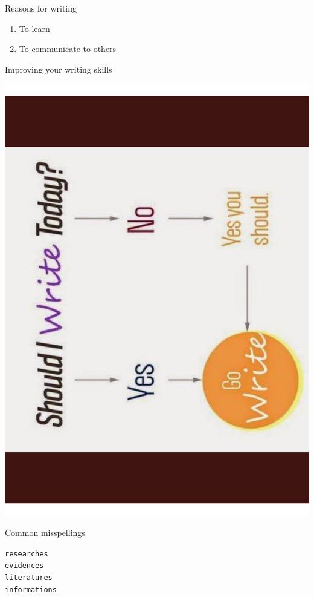 \documentclass{beamer}
\begin{document}
% 
\begin{frame}{Reasons for writing}
	\begin{enumerate}
	\item To \alert{learn}
	\item To \alert{communicate} to others
	\end{enumerate}
\end{frame}

% 
\begin{frame}{Improving your writing skills}
	\begin{center}
	\includegraphics[angle = 270, width = .85\textwidth]{images/should_I_write_today.pdf}
	\end{center}
	\nocite{}
\end{frame}

% 
\begin{frame}{Common misspellings}
	\begin{center}
	\huge{\texttt{researches} \\
	\vspace{0.2in}
	\texttt{evidences} \\
	\vspace{0.2in}
	\texttt{literatures} \\
	\vspace{0.2in}
	\texttt{informations}
	}
	\end{center}
\end{frame}
\end{document}
